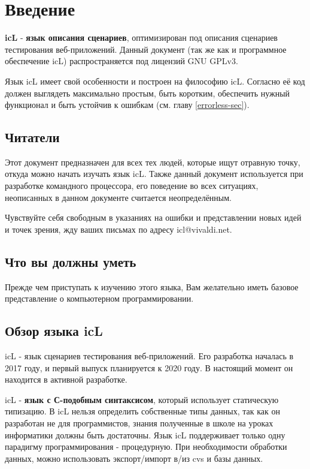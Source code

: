 \section{Введение}

\textbf{icL} - \textbf{язык описания сценариев}, оптимизирован под описания сценариев тестирования веб-приложений. Данный документ (так же как и программное обеспечение icL) распространяется под лицензий GNU GPLv3.

Язык icL имеет свой особенности и построен на философию icL. Согласно её код должен выглядеть максимально простым, быть коротким, обеспечить нужный функционал и быть устойчив к ошибкам (см. главу \ref{errorless-sec}).

\subsection{Читатели}

Этот документ предназначен для всех тех людей, которые ищут отравную точку, откуда можно начать изучать язык icL. Также данный документ используется при разработке командного процессора, его поведение  во всех ситуациях, неописанных в данном документе считается неопределённым.

Чувствуйте себя свободным в указаниях на ошибки и представлении новых идей и точек зрения, жду ваших письмах по адресу icl@vivaldi.net.

\subsection{Что вы должны уметь}

Прежде чем приступать к изучению этого языка, Вам желательно иметь базовое представление о компьютерном программировании.

\subsection{Обзор языка icL}

icL - язык сценариев тестирования веб-приложений. Его разработка началась в 2017 году, и первый выпуск планируется к 2020 году. В настоящий момент он находится в активной разработке.

icL - \textbf{язык с С-подобным синтаксисом}, который использует статическую типизацию. В icL нельзя определить собственные типы данных, так как он разработан не для программистов, знания полученные в школе на уроках информатики должны быть достаточны. Язык icL поддерживает только одну парадигму программирования - процедурную. При необходимости обработки данных, можно использовать экспорт/импорт в/из cvs и базы данных.

